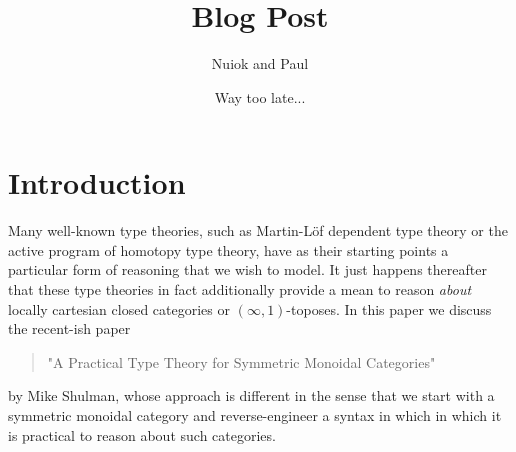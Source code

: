 \documentclass[pra,floatfix,
amsmath,superscriptaddress, 12pt]{article}
\title{Blog Post}
\author{Nuiok and Paul }
\date{Way too late...}
\theoremstyle{definition}
\begin{document}
\maketitle



\section{Introduction}



 Many well-known type theories, such as Martin-L\"{o}f dependent type theory or the active program of homotopy type theory, have as their starting points a particular form of reasoning that we wish to model.
%
It just happens thereafter that these type theories in fact additionally provide a mean to reason \emph{about} locally cartesian closed categories or $(\infty,1)$-toposes. In this paper we discuss the recent-ish paper 
\begin{quotation}
    "A Practical Type Theory for Symmetric Monoidal Categories"
\end{quotation}
by Mike Shulman, whose approach is different in the sense that we start with a symmetric monoidal category and reverse-engineer a syntax in which in which it is practical to reason about such categories.





\end{document}
